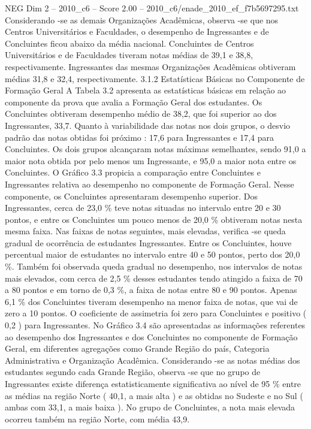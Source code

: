 \begin{textsample}{NEG Dim 2 – 2010\_c6 – Score 2.00 – 2010\_c6/enade\_2010\_ef\_f7b5697295.txt}
Considerando -se as demais Organizações Acadêmicas, observa -se que nos Centros Universitários e Faculdades, o desempenho de Ingressantes e de Concluintes ficou abaixo da média nacional.
Concluintes de Centros Universitários e de Faculdades tiveram notas médias de 39,1 e 38,8, respectivamente.
Ingressantes das mesmas Organizações Acadêmicas obtiveram médias 31,8 e 32,4, respectivamente. 3.1.2 Estatísticas Básicas no Componente de Formação Geral A Tabela 3.2 apresenta as estatísticas básicas em relação ao componente da prova que avalia a Formação Geral dos estudantes.
Os Concluintes obtiveram desempenho médio de 38,2, que foi superior ao dos Ingressantes, 33,7.
Quanto à variabilidade das notas nos dois grupos, o desvio padrão das notas obtidas foi próximo : 17,6 para Ingressantes e 17,4 para Concluintes.
Os dois grupos alcançaram notas máximas semelhantes, sendo 91,0 a maior nota obtida por pelo menos um Ingressante, e 95,0 a maior nota entre os Concluintes.
O Gráfico 3.3 propicia a comparação entre Concluintes e Ingressantes relativa ao desempenho no componente de Formação Geral.
Nesse componente, os Concluintes apresentaram desempenho superior.
Dos Ingressantes, cerca de 23,0 \% teve notas situadas no intervalo entre 20 e 30 pontos, e entre os Concluintes um pouco menos de 20,0 \% obtiveram notas nesta mesma faixa.
Nas faixas de notas seguintes, mais elevadas, verifica -se queda gradual de ocorrência de estudantes Ingressantes.
Entre os Concluintes, houve percentual maior de estudantes no intervalo entre 40 e 50 pontos, perto dos 20,0 \%.
Também foi observada queda gradual no desempenho, nos intervalos de notas mais elevados, com cerca de 2,5 \% desses estudantes tendo atingido a faixa de 70 a 80 pontos e em torno de 0,3 \%, a faixa de notas entre 80 e 90 pontos.
Apenas 6,1 \% dos Concluintes tiveram desempenho na menor faixa de notas, que vai de zero a 10 pontos.
O coeficiente de assimetria foi zero para Concluintes e positivo ( 0,2 ) para Ingressantes.
No Gráfico 3.4 são apresentadas as informações referentes ao desempenho dos Ingressantes e dos Concluintes no componente de Formação Geral, em diferentes agregações como Grande Região do país, Categoria Administrativa e Organização Acadêmica.
Considerando -se as notas médias dos estudantes segundo cada Grande Região, observa -se que no grupo de Ingressantes existe diferença estatisticamente significativa ao nível de 95 \% entre as médias na região Norte ( 40,1, a mais alta ) e as obtidas no Sudeste e no Sul ( ambas com 33,1, a mais baixa ).
No grupo de Concluintes, a nota mais elevada ocorreu também na região Norte, com média 43,9.

\end{textsample}
